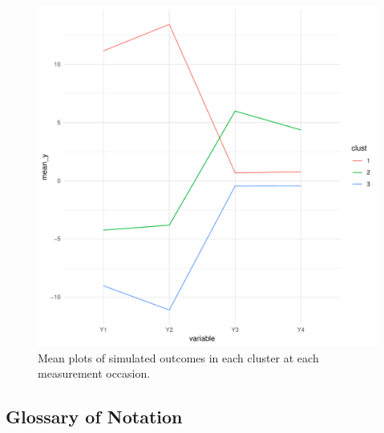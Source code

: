 \documentclass{article}
\begin{document}
\begin{figure}[h]
	\label{fig:sim1_means}
	\caption{Mean plots of simulated outcomes in each cluster at each measurement occasion.}
	\centering
	\includegraphics[width = 1\textwidth]{y_means.pdf}
\end{figure}


\newpage
\subsection*{Glossary of Notation}
\end{document}
